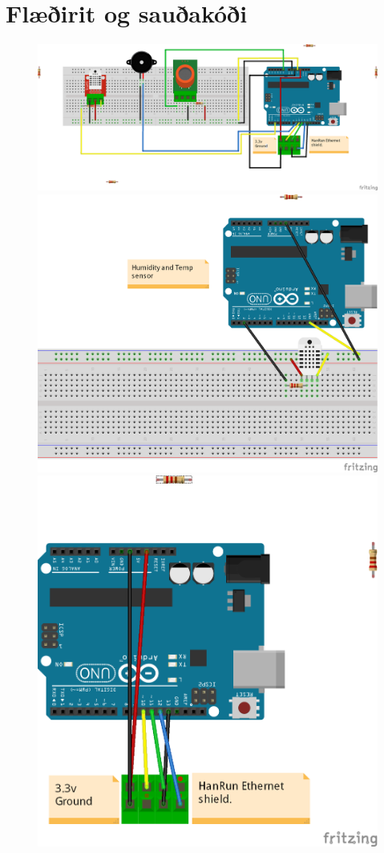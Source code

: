 \section{Flæðirit og sauðakóði}
\begin{figure}[h]
\includegraphics[scale=.4]{img/project}
\includegraphics[scale=.4]{img/Humi_temp_bb} 
\includegraphics[scale=.5]{img/ethernet2}
\end{figure}
